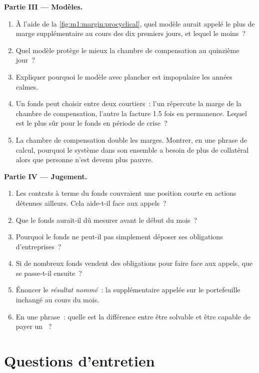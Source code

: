 \begin{problem}
\medskip\noindent\textbf{Partie III --- Modèles.}
\begin{enumerate}[resume]
\item À l'aide de la \cref{fig:m1:margin:procyclical}, quel modèle aurait appelé le plus de marge supplémentaire
au cours des dix premiers jours, et lequel le moins~?
\item Quel modèle protège le mieux la chambre de compensation au quinzième jour~?
\item Expliquer pourquoi le modèle avec plancher est impopulaire les années calmes.
\item Un fonds peut choisir entre deux courtiers~: l'un répercute la marge de la
chambre de compensation, l'autre la facture 1.5 fois en permanence. Lequel est le plus sûr
pour le fonds en période de crise~?
\item La chambre de compensation double les marges. Montrer, en une phrase de calcul,
pourquoi le système dans son ensemble a besoin de plus de collatéral alors que personne
n'est devenu plus pauvre.
\end{enumerate}

\medskip\noindent\textbf{Partie IV --- Jugement.}
\begin{enumerate}[resume]
\item Les contrats à terme du fonds couvraient une position courte en actions détenues
ailleurs. Cela aide-t-il face aux appels~?
\item Que le fonds aurait-il dû mesurer avant le début du mois~?
\item Pourquoi le fonds ne peut-il pas simplement déposer ses obligations d'entreprises~?
\item Si de nombreux fonds vendent des obligations pour faire face aux appels, que se passe-t-il ensuite~?
\item Énoncer le \emph{résultat nommé}~: la  supplémentaire appelée sur
le portefeuille inchangé au cours du mois.
\item En une phrase~: quelle est la différence entre être solvable et
être capable de payer un ~?
\end{enumerate}
\end{problem}

\section{Questions d'entretien}

